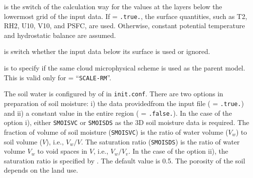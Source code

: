  is the switch of the calculation way for the values at the \scale layers below the lowermost grid of the input data.
If  = \verb|.true.|, the surface quantities, such as T2, RH2, U10, V10, and PSFC, are used.
Otherwise, constant potential temperature and hydrostatic balance are assumed.

 is switch whether the input data below its surface is used or ignored.

 is to specify if the same cloud microphysical scheme is used as the parent model.
This is valid only for  = ``\verb|SCALE-RM|''.


The soil water is configured by  of  in \verb|init.conf|.
There are two options in preparation of soil moisture: i) the data providedfrom the input file ( = \verb|.true.|) and ii) a constant value in the entire region ( = \verb|.false.|).
In the case of the option i), either \verb|SMOISVC| or \verb|SMOISDS| as the 3D soil moisture data is required.
The fraction of volume of soil moisture (\verb|SMOISVC|) is the ratio of water volume ($V_w$) to soil volume ($V$), i.e., $V_w / V$.
The saturation ratio (\verb|SMOISDS|) is the ratio of water volume $V_w$ to void spaces in $V$, i.e., $V_w / V_v$.
%
In the case of the option ii), the saturation ratio is specified by .
The default value is 0.5.
The porosity of the soil depends on the land use.




